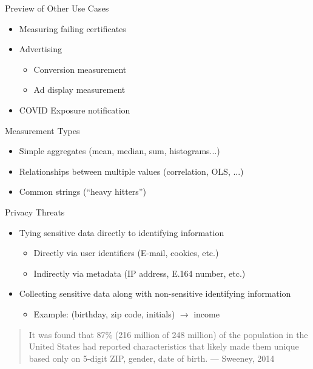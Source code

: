 \documentclass[helvetica]{beamer}
\begin{document}
\begin{frame}{Preview of Other Use Cases}
  \begin{itemize}
  \item Measuring failing certificates    
  \item Advertising
    \begin{itemize}
    \item Conversion measurement
    \item Ad display measurement      
    \end{itemize}
  \item COVID Exposure notification
  \end{itemize}

\end{frame}

\begin{frame}{Measurement Types}
  \begin{itemize}
  \item Simple aggregates (mean, median, sum, histograms...)
  \item Relationships between multiple values (correlation, OLS, ...)
  \item Common strings (``heavy hitters'')    
  \end{itemize}
\end{frame}

\begin{frame}{Privacy Threats}

  \begin{itemize}
  \item Tying sensitive data directly to identifying information
    \begin{itemize}
    \item Directly via user identifiers (E-mail, cookies, etc.)
    \item Indirectly via metadata (IP address, E.164 number, etc.)
    \end{itemize}

  \item Collecting sensitive data along with non-sensitive identifying information
    \begin{itemize}
    \item Example: (birthday, zip code, initials) $\rightarrow$ income
      \end{itemize}
  \end{itemize}

  \vspace{1ex}
  \begin{quote}
    It was found that 87\% (216 million of 248 million) of the
    population in the United States had reported characteristics that
    likely made them unique based only on {5-digit ZIP, gender, date of
      birth}. --- Sweeney, 2014~\cite{sweeney2000simple}
    \end{quote}
    
\end{frame}
\end{document}
